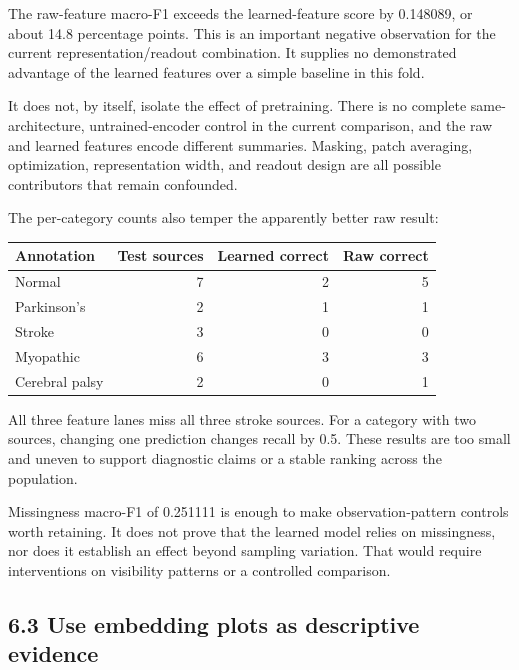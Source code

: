 \documentclass[11pt,letterpaper]{article}
\newcounter{none}
\begin{document}
The raw-feature macro-F1 exceeds the learned-feature score by 0.148089,
or about 14.8 percentage points. This is an important negative
observation for the current representation/readout combination. It
supplies no demonstrated advantage of the learned features over a simple
baseline in this fold.

It does not, by itself, isolate the effect of pretraining. There is no
complete same-architecture, untrained-encoder control in the current
comparison, and the raw and learned features encode different summaries.
Masking, patch averaging, optimization, representation width, and
readout design are all possible contributors that remain confounded.

The per-category counts also temper the apparently better raw result:

\begin{minipage}{\linewidth}

{\def\LTcaptype{none} %
\begin{longtable}[]{@{}lrrr@{}}
\toprule\noalign{}
Annotation & Test sources & Learned correct & Raw correct \\
\midrule\noalign{}
\endhead
\bottomrule\noalign{}
\endlastfoot
Normal & 7 & 2 & 5 \\
Parkinson's & 2 & 1 & 1 \\
Stroke & 3 & 0 & 0 \\
Myopathic & 6 & 3 & 3 \\
Cerebral palsy & 2 & 0 & 1 \\
\end{longtable}
}

\end{minipage}

All three feature lanes miss all three stroke sources. For a category
with two sources, changing one prediction changes recall by 0.5. These
results are too small and uneven to support diagnostic claims or a
stable ranking across the population.

Missingness macro-F1 of 0.251111 is enough to make observation-pattern
controls worth retaining. It does not prove that the learned model
relies on missingness, nor does it establish an effect beyond sampling
variation. That would require interventions on visibility patterns or a
controlled comparison.

\subsection{6.3 Use embedding plots as descriptive
evidence}\label{use-embedding-plots-as-descriptive-evidence}
\end{document}
